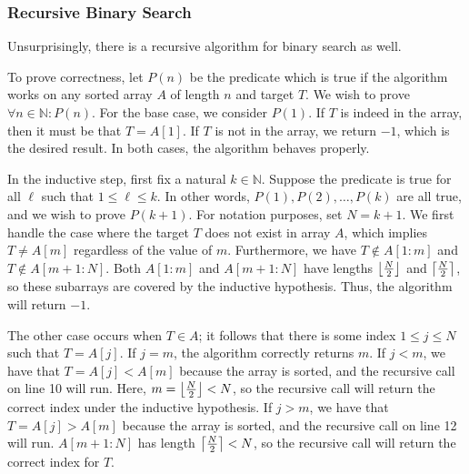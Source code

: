 \documentclass[11pt]{article}
\DeclarePairedDelimiter\floor{\lfloor}{\rfloor}
\DeclarePairedDelimiter\ceiling{\lceil}{\rceil}
\begin{document}
\subsubsection{Recursive Binary Search}
Unsurprisingly, there is a recursive algorithm for binary search as well.

\IncMargin{2em}
\begin{algorithm}[H]
    \footnotesize
    \DontPrintSemicolon
     {
         {
             {
                \;
            } 
        } 
    }
    \BlankLine
\end{algorithm}\DecMargin{2em} 
To prove correctness, let $P(n)$ be the predicate which is true if the algorithm works on any sorted array $A$ of length $n$ and target $T$. We wish to prove $\forall n \in \mathbb{N}: P(n)$. For the base case, we consider $P(1)$. If $T$ is indeed in the array, then it must be that $T = A[1]$. If $T$ is not in the array, we return $-1$, which is the desired result. In both cases, the algorithm behaves properly. 

In the inductive step, first fix a natural $k \in \mathbb{N}$. Suppose the predicate is true for all $\ell$ such that $1 \leq \ell \leq k$. In other words, $P(1), P(2), \dots, P(k)$ are all true, and we wish to prove $P(k + 1)$. For notation purposes, set $N = k + 1$. We first handle the case where the target $T$ does not exist in array $A$, which implies $T \neq A[m]$ regardless of the value of $m$. Furthermore, we have $T \notin A[1:m]$ and $T \notin A[m + 1:N]$. Both $A[1:m]$ and $A[m + 1:N]$ have lengths $\floor*{\frac{N}{2}}$ and $\ceiling*{\frac{N}{2}}$, so these subarrays are covered by the inductive hypothesis. Thus, the algorithm will return $-1$.  

The other case occurs when $T \in A$; it follows that there is some index $1 \leq j \leq N$ such that $T = A[j]$. If $j = m$, the algorithm correctly returns $m$. If $j < m$, we have that $T = A[j] < A[m]$ because the array is sorted, and the recursive call on line 10 will run. Here, $m = \floor*{\frac{N}{2}} < N$, so the recursive call will return the correct index under the inductive hypothesis. If $j > m$, we have that $T = A[j] > A[m]$ because the array is sorted, and the recursive call on line 12 will run. $A[m + 1: N]$ has length $\ceiling*{\frac{N}{2}} < N$, so the recursive call will return the correct index for $T$. 
\end{document}
